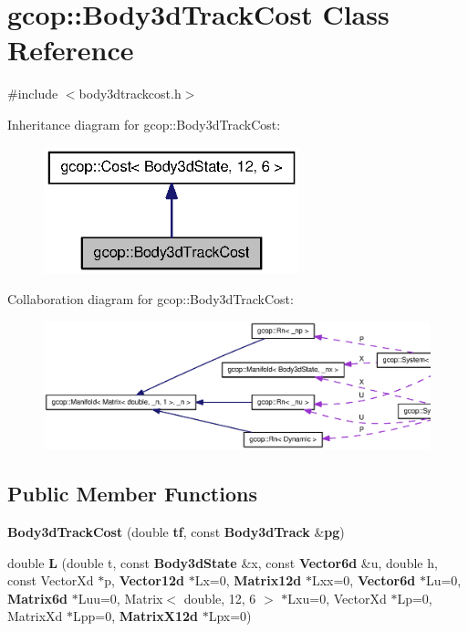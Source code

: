 \section{gcop\-:\-:\-Body3d\-Track\-Cost \-Class \-Reference}
\label{classgcop_1_1Body3dTrackCost}


{\ttfamily \#include $<$body3dtrackcost.\-h$>$}



\-Inheritance diagram for gcop\-:\-:\-Body3d\-Track\-Cost\-:
\nopagebreak
\begin{figure}[H]
\begin{center}
\leavevmode
\includegraphics[width=210pt]{classgcop_1_1Body3dTrackCost__inherit__graph}
\end{center}
\end{figure}


\-Collaboration diagram for gcop\-:\-:\-Body3d\-Track\-Cost\-:
\nopagebreak
\begin{figure}[H]
\begin{center}
\leavevmode
\includegraphics[width=350pt]{classgcop_1_1Body3dTrackCost__coll__graph}
\end{center}
\end{figure}
\subsection*{\-Public \-Member \-Functions}
\begin{DoxyCompactItemize}
\item 
{\bf \-Body3d\-Track\-Cost} (double {\bf tf}, const {\bf \-Body3d\-Track} \&{\bf pg})
\item 
double {\bf \-L} (double t, const {\bf \-Body3d\-State} \&x, const {\bf \-Vector6d} \&u, double h, const \-Vector\-Xd $\ast$p, {\bf \-Vector12d} $\ast$\-Lx=0, {\bf \-Matrix12d} $\ast$\-Lxx=0, {\bf \-Vector6d} $\ast$\-Lu=0, {\bf \-Matrix6d} $\ast$\-Luu=0, \-Matrix$<$ double, 12, 6 $>$ $\ast$\-Lxu=0, \-Vector\-Xd $\ast$\-Lp=0, \-Matrix\-Xd $\ast$\-Lpp=0, {\bf \-Matrix\-X12d} $\ast$\-Lpx=0)
\end{DoxyCompactItemize}
